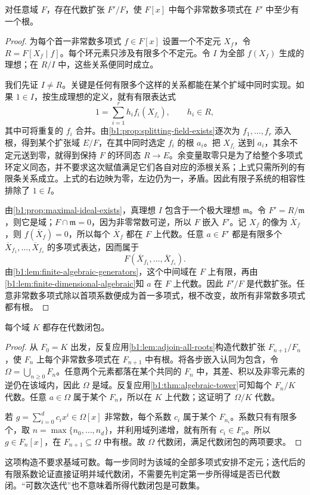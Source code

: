 \begin{lemma}\label{b1:lem:adjoin-all-roots}
	对任意域 \(F\)，存在代数扩张 \(F'/F\)，使 \(F[x]\) 中每个非常数多项式在 \(F'\) 中至少有一个根。
\end{lemma}
\begin{proof}
	为每个首一非常数多项式 \(f\in F[x]\) 设置一个不定元 \(X_f\)，令 \(R=F[X_f\mid f]\)。每个环元素只涉及有限多个不定元。令 \(I\) 为全部 \(f(X_f)\) 生成的理想；在 \(R/I\) 中，这些关系便同时成立。

	我们先证 \(I\neq R\)。关键是任何有限多个这样的关系都能在某个扩域中同时实现。如果 \(1\in I\)，按生成理想的定义，就有有限表达式
	\[
		1=\sum_{i=1}^r h_i f_i(X_{f_i}),\qquad h_i\in R,
	\]
	其中可将重复的 \(f_i\) 合并。由\cref{b1:prop:splitting-field-exists}逐次为 \(f_1,\ldots,f_r\) 添入根，得到某个扩张域 \(E/F\)，在其中同时选定 \(f_i\) 的根 \(a_i\)。把 \(X_{f_i}\) 送到 \(a_i\)，其余不定元送到零，就得到保持 \(F\) 的环同态 \(R\rightarrow E\)。余变量取零只是为了给整个多项式环定义同态，并不要求这次赋值满足它们各自对应的添根关系；上式只需所列的有限条关系成立。上式的右边映为零，左边仍为一，矛盾。因此有限子系统的相容性排除了 \(1\in I\)。

	由\cref{b1:prop:maximal-ideal-exists}，真理想 \(I\) 包含于一个极大理想 \(\mathfrak m\)。令 \(F'=R/\mathfrak m\)，则它是域；\(F\cap\mathfrak m=0\)，因为非零常数可逆，所以 \(F\) 嵌入 \(F'\)。记 \(X_f\) 的像为 \(\overline X_f\)，则 \(f(\overline X_f)=0\)，所以每个 \(\overline X_f\) 都在 \(F\) 上代数。任意 \(a\in F'\) 都是有限多个 \(\overline X_{f_1},\ldots,\overline X_{f_s}\) 的多项式表达，因而属于
	\[
		F(\overline X_{f_1},\ldots,\overline X_{f_s}).
	\]
	由\cref{b1:lem:finite-algebraic-generators}，这个中间域在 \(F\) 上有限，再由\cref{b1:lem:finite-dimensional-algebraic}知 \(a\) 在 \(F\) 上代数。因此 \(F'/F\) 是代数扩张。任意非常数多项式除以首项系数便成为首一多项式，根不改变，故所有非常数多项式都有根。
\end{proof}

\begin{theorem}\label{b1:thm:algebraic-closure}
	每个域 \(K\) 都存在代数闭包。
\end{theorem}
\begin{proof}
	从 \(F_0=K\) 出发，反复应用\cref{b1:lem:adjoin-all-roots}构造代数扩张 \(F_{n+1}/F_n\)，使 \(F_n\) 上每个非常数多项式在 \(F_{n+1}\) 中有根。将各步嵌入认同为包含，令 \(\Omega=\bigcup_{n\geq0}F_n\)。任意两个元素都落在某个共同的 \(F_n\) 中，其差、积以及非零元素的逆仍在该域内，因此 \(\Omega\) 是域。反复应用\cref{b1:thm:algebraic-tower}可知每个 \(F_n/K\) 代数。任意 \(a\in\Omega\) 属于某个 \(F_n\)，所以在 \(K\) 上代数；这证明了 \(\Omega/K\) 代数。

	若 \(g=\sum_{i=0}^d c_ix^i\in\Omega[x]\) 非常数，每个系数 \(c_i\) 属于某个 \(F_{n_i}\)。系数只有有限多个，取 \(n=\max\{n_0,\ldots,n_d\}\)，并利用域列递增，就有所有 \(c_i\in F_n\)。所以 \(g\in F_n[x]\)，在 \(F_{n+1}\subseteq\Omega\) 中有根。故 \(\Omega\) 代数闭，满足代数闭包的两项要求。
\end{proof}
这项构造不要求基域可数。每一步同时为该域的全部多项式安排不定元；迭代后的有限系数论证直接证明并域代数闭，不需要先判定第一步所得域是否已代数闭。“可数次迭代”也不意味着所得代数闭包是可数集。

